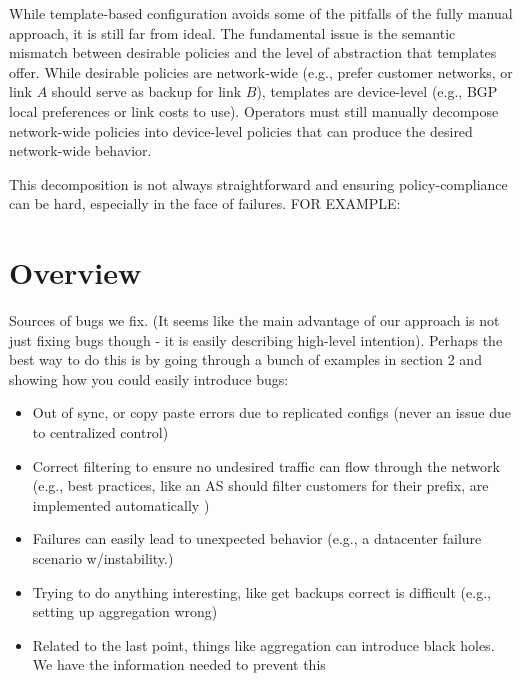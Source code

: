 \documentclass{paper}
\begin{document}

While template-based configuration avoids some of the pitfalls of the fully manual approach, it is still far from ideal. The fundamental issue is the semantic mismatch between desirable policies and the level of abstraction that templates offer. While desirable policies are network-wide (e.g., prefer customer networks, or link $A$ should serve as backup for link $B$), templates are device-level (e.g., BGP local preferences or link costs to use). Operators must still manually decompose network-wide policies into device-level policies that can produce the desired network-wide behavior.

This decomposition is not always straightforward and ensuring policy-compliance can be hard, especially in the face of failures. FOR EXAMPLE:



\section{Overview}

Sources of bugs we fix. (It seems like the main advantage of our approach is not just fixing bugs though - it is easily describing high-level intention).
Perhaps the best way to do this is by going through a bunch of examples in section 2 and showing how you could easily introduce bugs:

\begin{itemize}
	\item Out of sync, or copy paste errors due to replicated configs (never an issue due to centralized control)
	\item Correct filtering to ensure no undesired traffic can flow through the network (e.g., best practices, like an AS should filter customers for their prefix, are implemented automatically )
	\item Failures can easily lead to unexpected behavior (e.g., a datacenter failure scenario w/instability.)
	\item Trying to do anything interesting, like get backups correct is difficult (e.g., setting up aggregation wrong)
	\item Related to the last point, things like aggregation can introduce black holes. We have the information needed to prevent this
\end{itemize}
\end{document}
